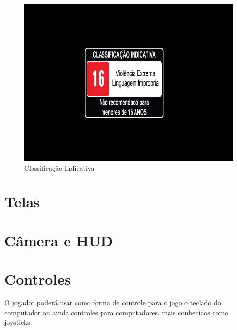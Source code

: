 \documentclass{article}
\begin{document}
\begin{figure}[!h]
    \centering
    \caption{Classificação Indicativa}
    \includegraphics[keepaspectratio=true,scale=0.35]{images/classificacao_indicativa.png}
\end{figure}

\section{Telas}
\section{Câmera e HUD}

\section{Controles}
O jogador poderá usar como forma de controle para o jogo o teclado do computador ou ainda controles para computadores, mais conhecidos como joysticks.
\end{document}
